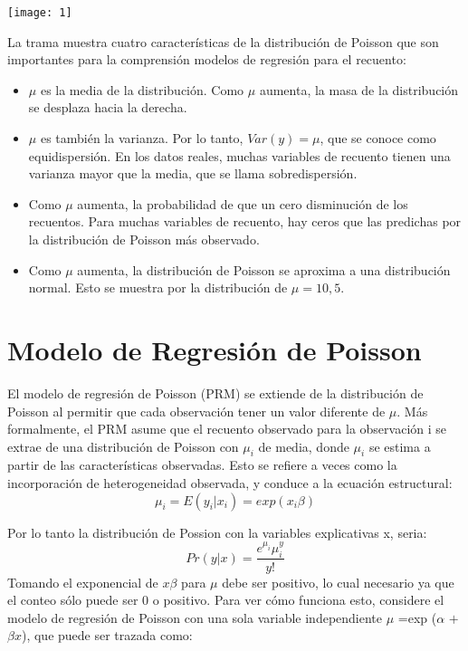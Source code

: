 \documentclass[11pt,fleqn]{book} %
\numberwithin{equation}{section} %
\numberwithin{figure}{section} %
\numberwithin{table}{section} %
\begin{document}
\begin{center}
\texttt{[image: 1]}
\end{center}

La trama muestra cuatro características de la distribución de Poisson que son importantes para la comprensión modelos de regresión para el recuento:
\begin{itemize}
\item  $\mu$ es la media de la distribución. Como  $\mu$  aumenta, la masa de la distribución se desplaza hacia la derecha.
 \item $\mu$ es también la varianza. Por lo tanto, $Var (y) = \mu$, que se conoce como equidispersión. En los datos reales, muchas variables de recuento tienen una varianza mayor que la media, que se llama sobredispersión.
 \item Como $\mu$ aumenta, la probabilidad de que un cero disminución de los recuentos. Para muchas variables de recuento, hay ceros que las predichas por la distribución de Poisson más observado.
 \item Como $\mu$ aumenta, la distribución de Poisson se aproxima a una distribución normal. Esto se muestra por la distribución de $\mu = 10,5$.
 \end{itemize}

\section{Modelo de Regresión de Poisson}

El modelo de regresión de Poisson (PRM) se extiende de la distribución de Poisson al permitir que cada observación tener un valor diferente de $\mu$. Más formalmente, el PRM asume que el recuento observado para la observación i se extrae de una distribución de Poisson con $\mu_{i}$ de media, donde $\mu_{i}$  se estima a partir  de las características observadas. Esto se refiere a veces como la incorporación de heterogeneidad observada, y conduce a la ecuación estructural:
\\
\begin{equation}
\mu_{i}  =E(y_{i}|x_{i})=exp(x_{i}\beta )
\end{equation}

Por lo tanto la distribución de Possion con la variables explicativas x, seria:
\begin{equation}
Pr(y | x) =\frac{{e}^{\mu_{i} }\mu_{i}^{y }}{y!}
\end{equation}
Tomando el exponencial de  $x\beta$ para  $\mu$ debe ser positivo, lo cual  necesario ya que el conteo sólo puede ser 0 o positivo. Para ver cómo funciona esto, considere el modelo de regresión de Poisson con una sola variable independiente $\mu$ =exp ($\alpha$ $+$ $\beta x$), que puede ser trazada como:
\end{document}
